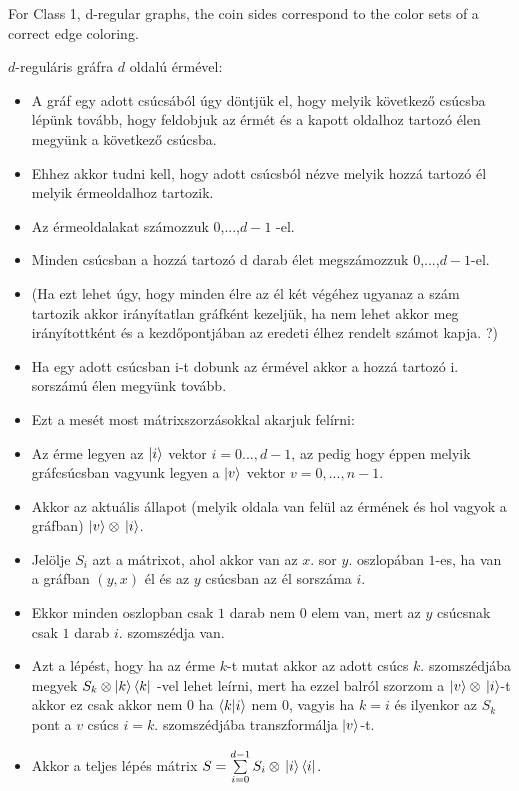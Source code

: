 
\theorem{}For Class 1, d-regular graphs, the coin sides correspond to the color sets of a correct edge coloring.

$d$-reguláris gráfra $d$ oldalú érmével:
\begin{itemize}
\item A gráf egy adott csúcsából úgy döntjük el, hogy melyik következő csúcsba lépünk tovább, hogy feldobjuk az érmét és a kapott oldalhoz tartozó élen megyünk a következő csúcsba.
\item Ehhez akkor tudni kell, hogy adott csúcsból nézve melyik hozzá tartozó él melyik érmeoldalhoz tartozik.
\item Az érmeoldalakat számozzuk $0$,...,$d-1$ -el.
\item Minden csúcsban a hozzá tartozó d darab élet megszámozzuk $0$,...,$d-1$-el.
\item (Ha ezt lehet úgy, hogy minden élre az él két végéhez ugyanaz a szám tartozik akkor irányítatlan gráfként kezeljük, ha nem lehet akkor meg irányítottként és a kezdőpontjában az eredeti élhez rendelt számot kapja. ?)
\item Ha egy adott csúcsban i-t dobunk az érmével akkor a hozzá tartozó i. sorszámú élen megyünk tovább.
\item Ezt a mesét most mátrixszorzásokkal akarjuk felírni:
\item Az érme legyen az $\ket{i}$ vektor $i=0...,d-1$, az pedig hogy éppen melyik gráfcsúcsban vagyunk legyen a $\ket{v}$ vektor $v=0,...,n-1$.
\item Akkor az aktuális állapot (melyik oldala van felül az érmének és hol vagyok a gráfban) $\ket{v}\otimes{}\ket{i}$.
\item Jelölje $S_i$ azt a mátrixot, ahol akkor van az $x$. sor $y$. oszlopában $1$-es, ha van a gráfban $(y,x)$ él és az $y$ csúcsban az él sorszáma $i$.
\item Ekkor minden oszlopban csak $1$ darab nem $0$ elem van, mert az $y$ csúcsnak csak $1$ darab $i$. szomszédja van.
\item Azt a lépést, hogy ha az érme $k$-t mutat akkor az adott csúcs $k$. szomszédjába megyek $S_k \otimes \ket{k}\bra{k}$ -vel lehet leírni, mert ha ezzel balról szorzom a $\ket{v} \otimes{} \ket{i}$-t akkor ez csak akkor nem $0$ ha $\bra{k}\ket{i}$ nem $0$, vagyis ha $k = i$ és ilyenkor az $S_k$ pont a $v$ csúcs $i=k.$ szomszédjába transzformálja $\ket{v}$-t.
\item Akkor a teljes lépés mátrix $S = \sum\limits_{i=0}^{d-1} S_i \otimes{} \ket{i}\bra{i}$.

\end{itemize}
